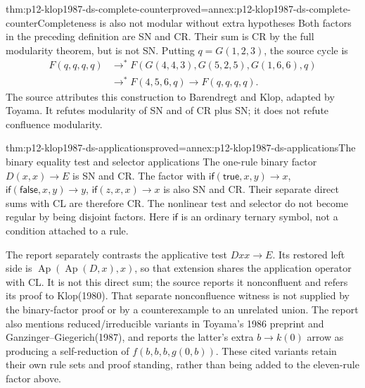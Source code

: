 \begin{hbtheorem}{thm:p12-klop1987-ds-complete-counter}{proved=annex:p12-klop1987-ds-complete-counter}{Completeness is also not modular without extra hypotheses}
Both factors in the preceding definition are SN and CR. Their
sum is CR by the full modularity theorem, but is not SN.
Putting \(q=G(1,2,3)\), the source cycle is
\begin{align*}
 F(q,q,q,q)&\to^*
 F(G(4,4,3),G(5,2,5),G(1,6,6),q)\\
 &\to^*F(4,5,6,q)\to F(q,q,q,q).
\end{align*}
The source attributes this construction to Barendregt and Klop,
adapted by Toyama. It refutes modularity of SN and of CR plus SN;
it does not refute confluence modularity.
\end{hbtheorem}

\begin{hbtheorem}{thm:p12-klop1987-ds-applications}{proved=annex:p12-klop1987-ds-applications}{The binary equality test and selector applications}
The one-rule binary factor \(D(x,x)\to E\) is SN and CR.
The factor with \(\mathsf{if}(\mathsf{true},x,y)\to x\),
\(\mathsf{if}(\mathsf{false},x,y)\to y\),
\(\mathsf{if}(z,x,x)\to x\) is also SN and CR.
Their separate direct sums with CL are therefore CR. The nonlinear
test and selector do not become regular by being disjoint factors.
Here \(\mathsf{if}\) is an ordinary ternary symbol, not a condition
attached to a rule.
\end{hbtheorem}

The report separately contrasts the applicative test \(Dxx\to E\).
Its restored left side is
\(\operatorname{Ap}(\operatorname{Ap}(D,x),x)\), so that
extension shares the application operator with CL. It is not this
direct sum; the source reports it nonconfluent and refers its proof
to Klop(1980). That separate nonconfluence witness is not supplied
by the binary-factor proof or by a counterexample to an unrelated union.
The report also mentions reduced/irreducible variants in Toyama's
1986 preprint and Ganzinger--Giegerich(1987), and reports the latter's
extra \(b\to k(0)\) arrow as producing a self-reduction of
\(f(b,b,b,g(0,b))\). These cited variants retain their own rule
sets and proof standing, rather than being added to the eleven-rule
factor above.
